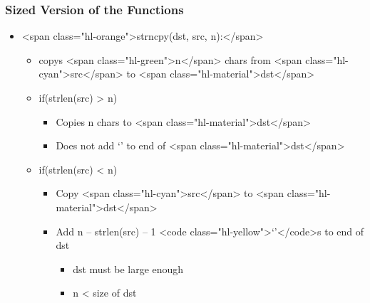 \documentclass{../c-lecture}
\begin{document}
\begin{frame}
  \frametitle{Sized Version of the Functions}
  \begin{itemize}
    \item <span class="hl-orange">strncpy(dst, src, n):</span>
    \begin{itemize}
      \item
        copys <span class="hl-green">n</span> chars from
        <span class="hl-cyan">src</span> to <span class="hl-material">dst</span>

      \item if(strlen(src) > n)
      \begin{itemize}
        \item Copies n chars to <span class="hl-material">dst</span>
        \item
          Does not add ‘\0’ to end of <span class="hl-material">dst</span>

      \end{itemize}
      \item if(strlen(src) < n)
      \begin{itemize}
        \item
          Copy <span class="hl-cyan">src</span> to
          <span class="hl-material">dst</span>

        \item
          Add n – strlen(src) – 1 <code class="hl-yellow">‘\0’</code>s to end of
          dst

        \begin{itemize}
          \item dst must be large enough
          \item n < size of dst
        \end{itemize}
      \end{itemize}
    \end{itemize}
  \end{itemize}
\end{frame}
\end{document}
